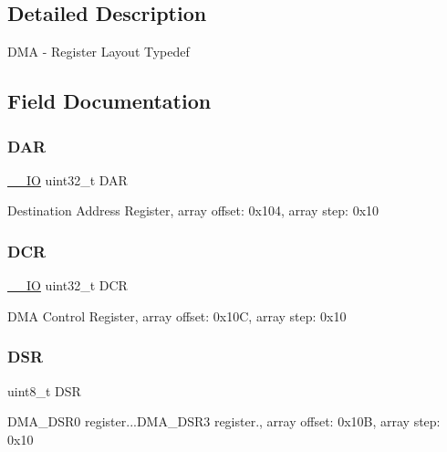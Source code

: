 \subsection{Detailed Description}
D\+MA -\/ Register Layout Typedef 

\subsection{Field Documentation}
\mbox{\label{struct_d_m_a___type_a5c5e4c91ad6bcfad9dae85c6c206234d}} 
\subsubsection{\texorpdfstring{DAR}{DAR}}
{\footnotesize\ttfamily \mbox{\hyperlink{core__cm0plus_8h_aec43007d9998a0a0e01faede4133d6be}{\+\_\+\+\_\+\+IO}} uint32\+\_\+t D\+AR}

Destination Address Register, array offset\+: 0x104, array step\+: 0x10 \mbox{\label{struct_d_m_a___type_af6225cb8f4938f98204d11afaffd41c9}} 
\subsubsection{\texorpdfstring{DCR}{DCR}}
{\footnotesize\ttfamily \mbox{\hyperlink{core__cm0plus_8h_aec43007d9998a0a0e01faede4133d6be}{\+\_\+\+\_\+\+IO}} uint32\+\_\+t D\+CR}

D\+MA Control Register, array offset\+: 0x10C, array step\+: 0x10 \mbox{\label{struct_d_m_a___type_af59ac6c373e8107836aab76df475a6cd}} 
\subsubsection{\texorpdfstring{DSR}{DSR}}
{\footnotesize\ttfamily uint8\+\_\+t D\+SR}

D\+M\+A\+\_\+\+D\+S\+R0 register...D\+M\+A\+\_\+\+D\+S\+R3 register., array offset\+: 0x10B, array step\+: 0x10 \mbox{\label{struct_d_m_a___type_a0e53b71919e79a3b3d41b79397733f49}} 
